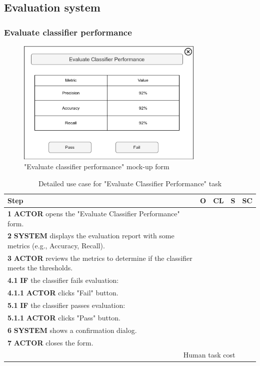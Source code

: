 \subsection{Evaluation system}

\subsubsection{Evaluate classifier performance}

\begin{figure}[H]
\centering
\includegraphics[width=0.8\textwidth]{figures/evaluate_classifier_performance.png}
\caption{"Evaluate classifier performance" mock-up form}
\end{figure}

\begin{table}[H]
\centering
\begin{tabular}{|l|c|c|c|c|}
\hline
\textbf{Step} & \textbf{O} & \textbf{CL} & \textbf{S} & \textbf{SC} \\
\hline
\textbf{1} \textbf{ACTOR} opens the "Evaluate Classifier Performance" form. & & & & \\
\hline
\textbf{2} \textbf{SYSTEM} displays the evaluation report with some metrics (e.g., Accuracy, Recall). & & & & \\
\hline
\textbf{3} \textbf{ACTOR} reviews the metrics to determine if the classifier meets the thresholds. & & & & \\
\hline
\textbf{4.1} \textbf{IF} the classifier fails evaluation: & & & & \\
\hline
\textbf{4.1.1} \textbf{ACTOR} clicks "Fail" button. & & & & \\
\hline
\textbf{5.1} \textbf{IF} the classifier passes evaluation: & & & & \\
\hline
\textbf{5.1.1} \textbf{ACTOR} clicks "Pass" button. & & & & \\
\hline
\textbf{6} \textbf{SYSTEM} shows a confirmation dialog. & & & & \\
\hline
\textbf{7} \textbf{ACTOR} closes the form. & & & & \\
\hline
\multicolumn{4}{|r|}{Human task cost} & \\
\hline
\end{tabular}
\caption{Detailed use case for "Evaluate Classifier Performance" task}
\label{table:evaluate_classifier_performance}
\end{table}